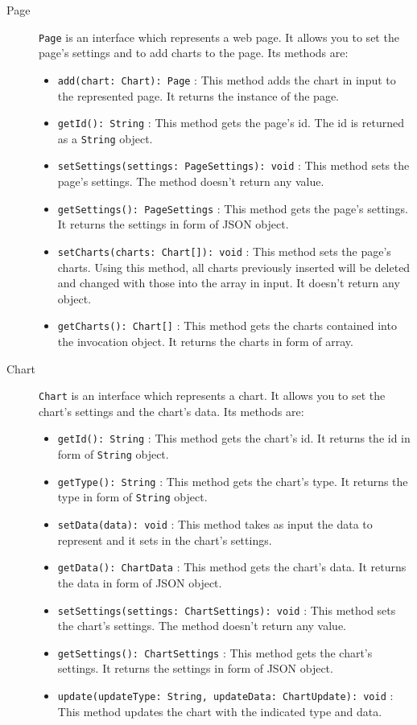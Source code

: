 \begin{description}
\begin{itemize}
		\end{itemize}
	\item[Page] \texttt{Page} is an interface which represents a web page. It allows you to set the page's settings and to add charts to the page. Its methods are:
	\begin{itemize}
		\item \texttt{add(chart: Chart): Page} : This method adds the chart in input to the represented page. It returns the instance of the page.
		\item \texttt{getId(): String} : This method gets the page's id. The id is returned as a \texttt{String} object.
		\item \texttt{setSettings(settings: PageSettings): void} : This method sets the page's settings. The method doesn't return any value.
		\item \texttt{getSettings(): PageSettings} : This method gets the page's settings. It returns the settings in form of JSON object.
		\item \texttt{setCharts(charts: Chart[]): void} : This method sets the page's charts. Using this method, all charts previously inserted will be deleted and changed with those into the array in input. It doesn't return any object.
		\item \texttt{getCharts(): Chart[]} : This method gets the charts contained into the invocation object. It returns the charts in form of array.
	\end{itemize}
	
	\item[Chart] \texttt{Chart} is an interface which represents a chart. It allows you to set the chart's settings and the chart's data. Its methods are:
	\begin{itemize}
		\item \texttt{getId(): String} : This method gets the chart's id. It returns the id in form of \texttt{String} object.
		\item \texttt{getType(): String} : This method gets the chart's type. It returns the type in form of \texttt{String} object.
		\item \texttt{setData(data): void} : This method takes as input the data to represent and it sets in the chart's settings.
		\item \texttt{getData(): ChartData} : This method gets the chart's data. It returns the data in form of JSON object.
		\item \texttt{setSettings(settings: ChartSettings): void} : This method sets the chart's settings. The method doesn't return any value.
		\item \texttt{getSettings(): ChartSettings} : This method gets the chart's settings. It returns the settings in form of JSON object.
		\item \texttt{update(updateType: String, updateData: ChartUpdate): void} : This method updates the chart with the indicated type and data. 
	\end{itemize}
	\end{description}
